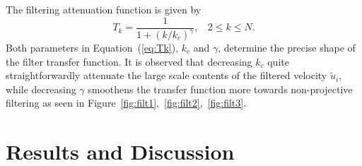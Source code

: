 \documentclass[times]{fldauth}
\begin{document}
The filtering attenuation function is given by
\begin{equation}
T_k = \frac{1}{1 + (k/k_c)^{\gamma}}, \ \ \ \ 2\le k\le N.\label{eq:Tk}
\end{equation}
Both parameters in Equation~(\ref{eq:Tk}), $k_c$ and $\gamma$, determine the precise shape of the filter transfer function. It is observed that decreasing $k_c$ quite straightforwardly attenuate the large scale contents of the filtered velocity $\widetilde{u}_{i}$, while decreasing $\gamma$ smoothens the transfer function more towards non-projective filtering as seen in Figure~\ref{fig:filt1},~\ref{fig:filt2},~\ref{fig:filt3}. 

\par
\section{Results and Discussion}\label{results}
\end{document}
